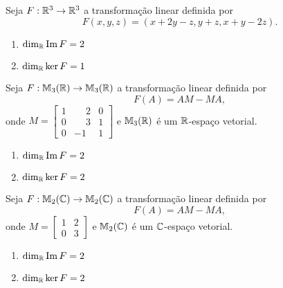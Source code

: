 \documentclass[12pt]{exam}
\begin{document}
\begin{exercicio}
  Seja $F : \mathbb{R}^3 \to \mathbb{R}^3$ a transforma\c{c}\~ao linear definida por
  \[
      F(x,y,z) = (x + 2y - z, y + z, x + y - 2z).
  \]
  \begin{solucao}
    \begin{enumerate}[label={\alph*})]
      \item $\dim_{\mathbb{R}}{\rm Im\,} F = 2$

      \item $\dim_{\mathbb{R}}\ker F = 1$
    \end{enumerate}
  \end{solucao}
\end{exercicio}

\begin{exercicio}
  Seja $F : \mathbb{M}_3(\mathbb{R}) \to \mathbb{M}_3(\mathbb{R})$ a transforma\c{c}\~ao linear definida por
  \[
      F(A) = AM - MA,
  \]
  onde $M = \begin{bmatrix}
    1 & \phantom{-}2 & 0\\0 & \phantom{-}3 & 1\\0 & -1 & 1
  \end{bmatrix}$ e $\mathbb{M}_3(\mathbb{R})$ \'e um $\mathbb{R}$-espa\c{c}o vetorial.
  \begin{solucao}
    \begin{enumerate}[label={\alph*})]
      \item $\dim_{\mathbb{R}}{\rm Im\,} F = 2$

      \item $\dim_{\mathbb{R}}\ker F = 2$
    \end{enumerate}
  \end{solucao}
\end{exercicio}

\begin{exercicio}\label{nucleo_imagem_fim}
  Seja $F : \mathbb{M}_2(\mathbb{C}) \to \mathbb{M}_2(\mathbb{C})$ a transforma\c{c}\~ao linear definida por
  \[
      F(A) = AM - MA,
  \]
  onde $M = \begin{bmatrix}
    1 & 2\\0 & 3
  \end{bmatrix}$ e $\mathbb{M}_2(\mathbb{C})$ \'e um $\mathbb{C}$-espa\c{c}o vetorial.
  \begin{solucao}
    \begin{enumerate}[label={\alph*})]
      \item $\dim_{\mathbb{R}}{\rm Im\,} F = 2$

      \item $\dim_{\mathbb{R}}\ker F = 2$
    \end{enumerate}
  \end{solucao}
\end{exercicio}
\end{document}
